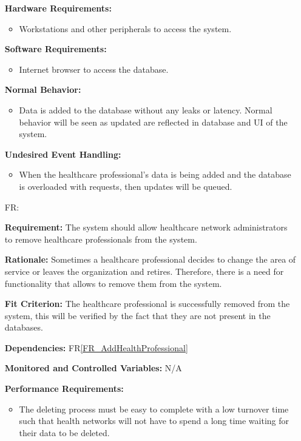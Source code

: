 \documentclass[12pt]{article}
\newcounter{reqnum} %
\begin{document}
\begin{itemize}
\textbf{Hardware Requirements:} 
\begin{itemize}
  \item Workstations and other peripherals to access the system.
\end{itemize}

\textbf{Software Requirements:} 
\begin{itemize}
  \item Internet browser to access the database.
\end{itemize}

\textbf{Normal Behavior:}
\begin{itemize}
  \item Data is added to the database without any leaks or latency. Normal behavior will be seen as updated are reflected in database and UI of the system.
\end{itemize} 

\textbf{Undesired Event Handling:}
\begin{itemize}
  \item When the healthcare professional's data is being added and the database is overloaded with requests, then updates will be queued.
\end{itemize} 

\item[FR\refstepcounter{reqnum}\thereqnum \label{FR_RemoveHealthProfessionals}:] 

\textbf{Requirement:} The system should allow healthcare network administrators to remove healthcare professionals from the system. 

\textbf{Rationale:} Sometimes a healthcare professional decides to change the area of service or leaves the organization and retires. Therefore, there is a need for functionality that allows to remove them from the system.

\textbf{Fit Criterion:} The healthcare professional is successfully removed from the system, this will be verified by the fact that they are not present in the databases. 

\textbf{Dependencies:} FR\ref{FR_AddHealthProfessional}

\textbf{Monitored and Controlled Variables:} N/A

\textbf{Performance Requirements:}
\begin{itemize}
  \item The deleting process must be easy to complete with a low turnover time such that health networks will not have to spend a long time waiting for their data to be deleted.
\end{itemize} 


\end{itemize}
\end{document}
